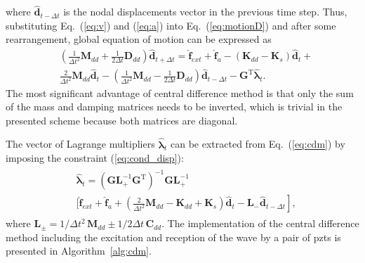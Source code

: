 \documentclass[a4paper,fleqn]{cas-dc}
\begin{document}
where \(\widehat{\textbf{d}}_{t-\Delta t}\) is the nodal displacements vector in the previous time step.
Thus, substituting Eq.~(\ref{eq:v}) and (\ref{eq:a}) into Eq.~(\ref{eq:motionD}) and after some rearrangement, global equation of motion can be expressed as
\begin{equation}
	\begin{split}
		&\left(\frac{1}{\Delta t^2}\textbf{M}_{dd}+\frac{1}{2\Delta t}\textbf{D}_{dd} \right)\widehat{\textbf{d}}_{t+\Delta t}  =  \widehat{\textbf{f}}_{ext} + \widehat{\textbf{f}}_{a} - 
		\left( \textbf{K}_{dd}-\textbf{K}_s\right)\widehat{\textbf{d}}_t
		+ \\
		&\frac{2}{\Delta t^2}\textbf{M}_{dd}\widehat{\textbf{d}}_t - \left(\frac{1}{\Delta t^2}\textbf{M}_{dd}-\frac{1}{2\Delta t}\textbf{D}_{dd}\right)\widehat{\textbf{d}}_{t-\Delta t}-\textbf{G}^{\mathrm{T}}\widehat{\boldsymbol{\lambda}}_t.
	\end{split}
	\label{eq:cdm}
\end{equation}
The most significant advantage of central difference method is that only the sum of the mass and damping matrices needs to be inverted, which is trivial in the presented scheme because both matrices are diagonal.

The vector of Lagrange multipliers \(\widehat{\boldsymbol{\lambda}}_t\) can be extracted from Eq.~(\ref{eq:cdm}) by imposing the constraint (\ref{eq:cond_disp}):
\begin{eqnarray}
	\begin{split}
		&\widehat{\boldsymbol{\lambda}}_t = \left(\textbf{G}\textbf{L}_+^{-1}\textbf{G}^{\mathrm{T}} 	\right)^{-1}\textbf{G}\textbf{L}_+^{-1} \\
		&\Bigg[ \widehat{\textbf{f}}_{ext} + \widehat{\textbf{f}}_{a}
		 + \left.\left(\frac{2}{\Delta t^2}\textbf{M}_{dd}-\textbf{K}_{dd}+\textbf{K}_s\right)\widehat{\textbf{d}}_t -\textbf{L}_-\widehat{\textbf{d}}_{t-\Delta t} \right],
	\end{split}
	\label{eq:lambda}
\end{eqnarray}
where \(\textbf{L}_{\pm}=1/{\Delta t^2}\,\textbf{M}_{dd}\pm 1/{2\Delta t}\,\textbf{C}_{dd}\).
The implementation of the central difference method including the excitation and reception of the wave by a pair of \acp{pzt} is presented in Algorithm~\ref{alg:cdm}.
\end{document}
